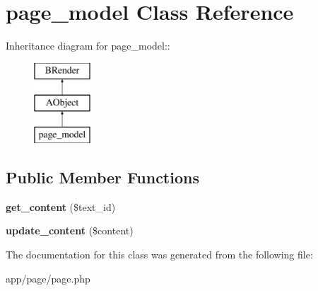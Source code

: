 \section{page\_\-model Class Reference}
\label{classpage__model}
Inheritance diagram for page\_\-model::\begin{figure}[H]
\begin{center}
\leavevmode
\includegraphics[height=3cm]{classpage__model}
\end{center}
\end{figure}
\subsection*{Public Member Functions}
\begin{DoxyCompactItemize}
\item 
{\bfseries get\_\-content} (\$text\_\-id)\label{classpage__model_ab25fd475e50fd179b8bec3e9b6e0848d}

\item 
{\bfseries update\_\-content} (\$content)\label{classpage__model_a419240148f1dbcff164083fdb83b496a}

\end{DoxyCompactItemize}


The documentation for this class was generated from the following file:\begin{DoxyCompactItemize}
\item 
app/page/page.php\end{DoxyCompactItemize}
